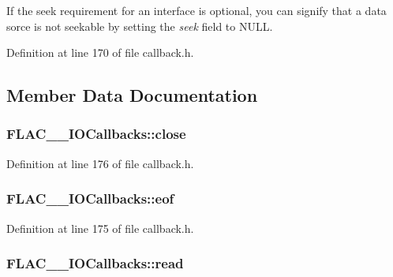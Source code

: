 If the seek requirement for an interface is optional, you can signify that a data sorce is not seekable by setting the {\itshape seek} field to {\ttfamily N\+U\+LL}. 

Definition at line 170 of file callback.\+h.



\subsection{Member Data Documentation}
\subsubsection[{\texorpdfstring{close}{close}}]{ F\+L\+A\+C\+\_\+\+\_\+\+I\+O\+Callbacks\+::close}\hypertarget{struct_f_l_a_c_____i_o_callbacks_a8e447ae1999d9da9ebad5417f47223be}{}\label{struct_f_l_a_c_____i_o_callbacks_a8e447ae1999d9da9ebad5417f47223be}


Definition at line 176 of file callback.\+h.

\subsubsection[{\texorpdfstring{eof}{eof}}]{ F\+L\+A\+C\+\_\+\+\_\+\+I\+O\+Callbacks\+::eof}\hypertarget{struct_f_l_a_c_____i_o_callbacks_a4810838b77667dc02415c854b2103e66}{}\label{struct_f_l_a_c_____i_o_callbacks_a4810838b77667dc02415c854b2103e66}


Definition at line 175 of file callback.\+h.

\subsubsection[{\texorpdfstring{read}{read}}]{ F\+L\+A\+C\+\_\+\+\_\+\+I\+O\+Callbacks\+::read}\hypertarget{struct_f_l_a_c_____i_o_callbacks_a6dd767bc254e31dc47c9a0d218e72190}{}\label{struct_f_l_a_c_____i_o_callbacks_a6dd767bc254e31dc47c9a0d218e72190}


